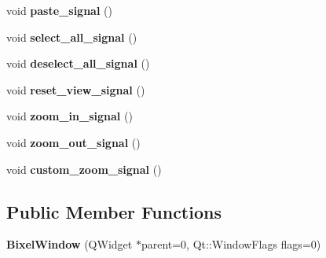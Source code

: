 \begin{DoxyCompactItemize}
\item 
\hypertarget{classBixelWindow_a587d0745d036eabace33de931104d4c7}{void {\bfseries paste\-\_\-signal} ()}\label{classBixelWindow_a587d0745d036eabace33de931104d4c7}

\item 
\hypertarget{classBixelWindow_a42b6e8b3cc3f837a6233c616ea26a9c4}{void {\bfseries select\-\_\-all\-\_\-signal} ()}\label{classBixelWindow_a42b6e8b3cc3f837a6233c616ea26a9c4}

\item 
\hypertarget{classBixelWindow_a5e64c14663eadc91c7c6015d4981fb70}{void {\bfseries deselect\-\_\-all\-\_\-signal} ()}\label{classBixelWindow_a5e64c14663eadc91c7c6015d4981fb70}

\item 
\hypertarget{classBixelWindow_a119d72d0e838a8d3689a3adecd4525e4}{void {\bfseries reset\-\_\-view\-\_\-signal} ()}\label{classBixelWindow_a119d72d0e838a8d3689a3adecd4525e4}

\item 
\hypertarget{classBixelWindow_a3905766a93b07f84fb2a42bf06d83f06}{void {\bfseries zoom\-\_\-in\-\_\-signal} ()}\label{classBixelWindow_a3905766a93b07f84fb2a42bf06d83f06}

\item 
\hypertarget{classBixelWindow_afe6f72f82acd783d9a558b7c0e320dd3}{void {\bfseries zoom\-\_\-out\-\_\-signal} ()}\label{classBixelWindow_afe6f72f82acd783d9a558b7c0e320dd3}

\item 
\hypertarget{classBixelWindow_a8b65e3840cb126f9d38d4edf7df0eba9}{void {\bfseries custom\-\_\-zoom\-\_\-signal} ()}\label{classBixelWindow_a8b65e3840cb126f9d38d4edf7df0eba9}

\end{DoxyCompactItemize}
\subsection*{Public Member Functions}
\begin{DoxyCompactItemize}
\item 
\hypertarget{classBixelWindow_ae334b79d3ae7e7dbd9a967c5a4281fdc}{{\bfseries Bixel\-Window} (Q\-Widget $\ast$parent=0, Qt\-::\-Window\-Flags flags=0)}\label{classBixelWindow_ae334b79d3ae7e7dbd9a967c5a4281fdc}

\end{DoxyCompactItemize}
